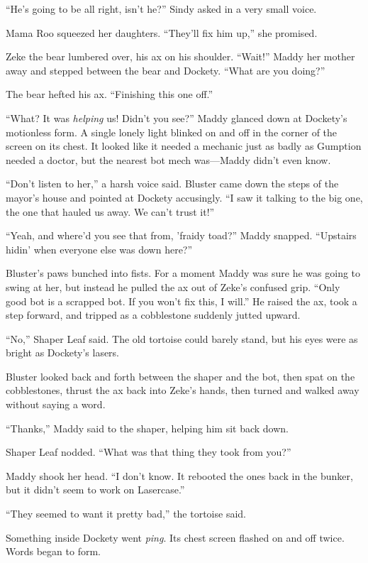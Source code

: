\documentclass[10pt]{article}
\begin{document}
``He's going to be all right, isn't he?'' Sindy asked in a very small
voice.

Mama Roo squeezed her daughters. ``They'll fix him up,'' she promised.

Zeke the bear lumbered over, his ax on his shoulder. ``Wait!'' Maddy her
mother away and stepped between the bear and Dockety. ``What are you
doing?''

The bear hefted his ax. ``Finishing this one off.''

``What? It was \emph{helping} us! Didn't you see?'' Maddy glanced down
at Dockety's motionless form. A single lonely light blinked on and off
in the corner of the screen on its chest. It looked like it needed a
mechanic just as badly as Gumption needed a doctor, but the nearest bot
mech was---Maddy didn't even know.

``Don't listen to her,'' a harsh voice said. Bluster came down the steps
of the mayor's house and pointed at Dockety accusingly. ``I saw it
talking to the big one, the one that hauled us away. We can't trust
it!''

``Yeah, and where'd you see that from, 'fraidy toad?'' Maddy snapped.
``Upstairs hidin' when everyone else was down here?''

Bluster's paws bunched into fists. For a moment Maddy was sure he was
going to swing at her, but instead he pulled the ax out of Zeke's
confused grip. ``Only good bot is a scrapped bot. If you won't fix this,
I will.'' He raised the ax, took a step forward, and tripped as a
cobblestone suddenly jutted upward.

``No,'' Shaper Leaf said. The old tortoise could barely stand, but his
eyes were as bright as Dockety's lasers.

Bluster looked back and forth between the shaper and the bot, then spat
on the cobblestones, thrust the ax back into Zeke's hands, then turned
and walked away without saying a word.

``Thanks,'' Maddy said to the shaper, helping him sit back down.

Shaper Leaf nodded. ``What was that thing they took from you?''

Maddy shook her head. ``I don't know. It rebooted the ones back in the
bunker, but it didn't seem to work on Lasercase.''

``They seemed to want it pretty bad,'' the tortoise said.

Something inside Dockety went \emph{ping}. Its chest screen flashed on
and off twice. Words began to form.
\end{document}
